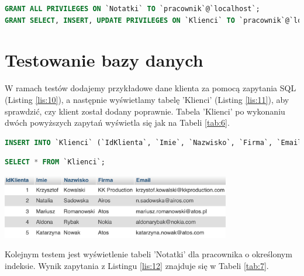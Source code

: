 \documentclass[eng,printmode,openany,oneside]{mgr}
\begin{document}
\begin{lstlisting}[caption={Przykładowe uprawnienia do tabel Notatki i Klienci dla pracownika}, language=SQL, label={lis:9}]
GRANT ALL PRIVILEGES ON `Notatki` TO `pracownik`@`localhost`;
GRANT SELECT, INSERT, UPDATE PRIVILEGES ON `Klienci` TO `pracownik`@`localhost`;
\end{lstlisting}

	

\section{Testowanie bazy danych}

W ramach testów dodajemy przykładowe dane klienta za pomocą zapytania SQL (Listing \ref{lis:10}), a następnie wyświetlamy tabelę 'Klienci' (Listing \ref{lis:11}), aby sprawdzić, czy klient został dodany poprawnie. Tabela 'Klienci' po wykonaniu dwóch powyższych zapytań wyświetla się jak na Tabeli \ref{tab:6}.



\newpage



\begin{lstlisting}[caption={Przykład dodawania klienta}, language=SQL, label={lis:10}]
INSERT INTO `Klienci` (`IdKlienta`, `Imie`, `Nazwisko`, `Firma`, `Email`) VALUES (NULL, 'Katarzyna', 'Nowak', 'Atos', 'katarzyna.nowak@atos.com');
\end{lstlisting}


\begin{lstlisting}[caption={Wyświetlanie tabeli 'Klienci'}, language=SQL, label={lis:11}]
SELECT * FROM `Klienci`;
\end{lstlisting}


	\begin{table}[H]
		\centering
		\caption{Wynik zapytań na tabeli 'Klienci'}
		\includegraphics[width=0.75\textwidth]{baza_select_tabela}
		\label{tab:6}
	\end{table}
	
Kolejnym testem jest wyświetlenie tabeli 'Notatki' dla pracownika o określonym indeksie. Wynik zapytania z Listingu \ref{lis:12} znajduje się w Tabeli \ref{tab:7}.
\end{document}
